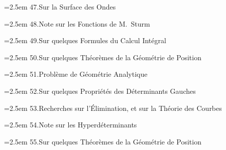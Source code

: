 \documentclass[11pt]{article}
\begin{document}
\noindent\hangindent=2.5em
47.\quad Sur la Surface des Ondes\par
\hspace{1.5em}{\small Liouville, t.~xi.\ (1846), pp.~291--296}\par

\noindent\hangindent=2.5em
48.\quad Note sur les Fonctions de M.\ Sturm\par
\hspace{1.5em}{\small Liouville, t.~xi.\ (1846), pp.~297--299}\par

\noindent\hangindent=2.5em
49.\quad Sur quelques Formules du Calcul Int\'egral\par
\hspace{1.5em}{\small Liouville, t.~xii.\ (1847), pp.~231--240}\par

\noindent\hangindent=2.5em
50.\quad Sur quelques Th\'eor\`emes de la G\'eom\'etrie de Position\par
\hspace{1.5em}{\small Crelle, t.~xxxi.\ (1846), pp.~213--227}\par

\noindent\hangindent=2.5em
51.\quad Probl\`eme de G\'eom\'etrie Analytique\par
\hspace{1.5em}{\small Crelle, t.~xxxi.\ (1846), pp.~227--230}\par

\noindent\hangindent=2.5em
52.\quad Sur quelques Propri\'et\'es des D\'eterminants Gauches\par
\hspace{1.5em}{\small Crelle, t.~xxxii.\ (1846), pp.~119--123}\par

\noindent\hangindent=2.5em
53.\quad Recherches sur l'\'Elimination, et sur la Th\'eorie des Courbes\par
\hspace{1.5em}{\small Crelle, t.~xxxiv.\ (1847), pp.~30--45}\par

\noindent\hangindent=2.5em
54.\quad Note sur les Hyperd\'eterminants\par
\hspace{1.5em}{\small Crelle, t.~xxxiv.\ (1847), pp.~148--152}\par

\noindent\hangindent=2.5em
55.\quad Sur quelques Th\'eor\`emes de la G\'eom\'etrie de Position\par
\hspace{1.5em}{\small Crelle, t.~xxxiv.\ (1847), pp.~270--275}\par
\end{document}
